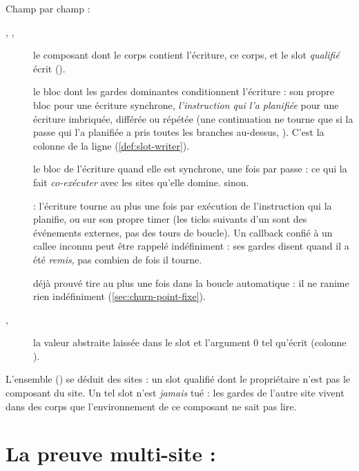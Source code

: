 Champ par champ :
\begin{description}
  \item[, , ] le composant dont le corps contient
        l'écriture, ce corps, et le slot \emph{qualifié} écrit ().
  \item[] le bloc dont les gardes dominantes conditionnent l'écriture :
        son propre bloc pour une écriture synchrone, \emph{l'instruction qui l'a planifiée}
        pour une écriture imbriquée, différée ou répétée (une continuation  ne
        tourne que si la passe qui l'a planifiée a pris toutes les branches au-dessus,
        ). C'est la colonne  de la ligne
        (\cref{def:slot-writer}).
  \item[] le bloc de l'écriture quand elle est synchrone, une fois par passe : ce
        qui la fait \emph{co-exécuter} avec les sites qu'elle domine.  sinon.
  \item[]  : l'écriture tourne au plus une fois par
        exécution de l'instruction qui la planifie, ou sur son propre timer (les ticks
        suivants d'un  sont des événements externes, pas des tours de
        boucle). Un callback confié à un callee inconnu peut être rappelé indéfiniment : ses
        gardes disent quand il a été \emph{remis}, pas combien de fois il tourne.
  \item[] déjà prouvé \og tire au plus une fois dans la boucle
        automatique\fg{} : il ne ranime rien indéfiniment (\cref{sec:churn-point-fixe}).
  \item[, ] la valeur abstraite laissée dans le slot et l'argument 0
        tel qu'écrit (colonne ).
\end{description}

L'ensemble  () se déduit des sites : un
slot qualifié dont le propriétaire n'est pas le composant du site. Un tel slot n'est
\emph{jamais} tué : les gardes de l'autre site vivent dans des corps que l'environnement de
ce composant ne sait pas lire.

\section[La preuve multi-site]{La preuve multi-site : }
\label{sec:churn-preuve}

